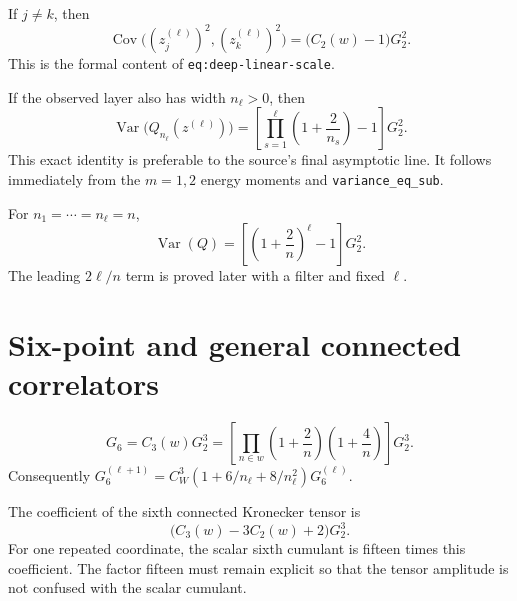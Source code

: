 \begin{corollary}
\label{cor:dln:squareCovariance}
If $j\neq k$, then
\[
 \operatorname{Cov}\big((z_j^{(\ell)})^2,(z_k^{(\ell)})^2\big)
   =\big(C_2(w)-1\big)G_2^2.
\]
This is the formal content of \texttt{eq:deep-linear-scale}.
\end{corollary}

\begin{theorem}
\label{thm:dln:energyVariance}
If the observed layer also has width $n_\ell>0$, then
\[
 \operatorname{Var}\big(Q_{n_\ell}(z^{(\ell)})\big)
 =\left[\prod_{s=1}^{\ell}\left(1+\frac2{n_s}\right)-1\right]G_2^2.
\]
This exact identity is preferable to the source's final asymptotic line.  It follows immediately
from the $m=1,2$ energy moments and \texttt{variance\_eq\_sub}.
\end{theorem}

\begin{corollary}
\label{cor:dln:equalWidthVariance}
For $n_1=\cdots=n_\ell=n$,
\[
 \operatorname{Var}(Q)=\left[\left(1+\frac2n\right)^\ell-1\right]G_2^2.
\]
The leading $2\ell/n$ term is proved later with a filter and fixed $\ell$.
\end{corollary}

\section{Six-point and general connected correlators}

\begin{corollary}
\label{cor:dln:sixPoint}
\[
 G_6=C_3(w)G_2^3
 =\left[\prod_{n\in w}\left(1+\frac2n\right)
                         \left(1+\frac4n\right)\right]G_2^3.
\]
Consequently
$G_6^{(\ell+1)}=C_W^3(1+6/n_\ell+8/n_\ell^2)G_6^{(\ell)}$.
\end{corollary}

\begin{corollary}
\label{cor:dln:connectedSix}
The coefficient of the sixth connected Kronecker tensor is
\[
 \big(C_3(w)-3C_2(w)+2\big)G_2^3.
\]
For one repeated coordinate, the scalar sixth cumulant is fifteen times this coefficient.  The
factor fifteen must remain explicit so that the tensor amplitude is not confused with the scalar
cumulant.
\end{corollary}

